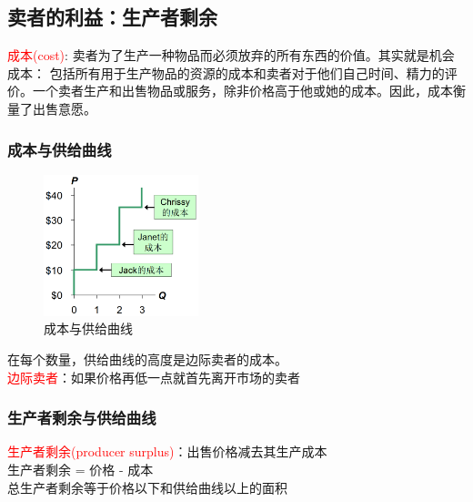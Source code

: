 \documentclass[12pt,a4paper]{article}
\begin{document}
\subsection{卖者的利益：生产者剩余}

\textcolor{red}{成本(cost)}: 卖者为了生产一种物品而必须放弃的所有东西的价值。其实就是机会成本： 包括所有用于生产物品的资源的成本和卖者对于他们自己时间、精力的评价。一个卖者生产和出售物品或服务，除非价格高于他或她的成本。因此，成本衡量了出售意愿。\\

\subsubsection{成本与供给曲线}
\begin{figure}[H] 
  \centering %
  \includegraphics[width=0.4\textwidth]{成本与供给曲线.png} 
  \caption{成本与供给曲线} %
\end{figure}

\noindent 在每个数量，供给曲线的高度是边际卖者的成本。\\
\textcolor{red}{边际卖者}：如果价格再低一点就首先离开市场的卖者

\subsubsection{生产者剩余与供给曲线}

\noindent \textcolor{red}{生产者剩余(producer surplus)}：出售价格减去其生产成本\\
生产者剩余 = 价格 - 成本\\
总生产者剩余等于价格以下和供给曲线以上的面积\\
\end{document}
